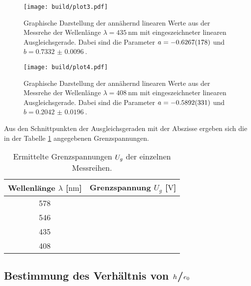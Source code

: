 \begin{figure}
    \centering
    \texttt{[image: build/plot3.pdf]}
    \caption{Graphische Darstellung der annähernd linearen Werte aus der Messrehe der Wellenlänge $\lambda = \SI{435}{\nano\meter}$ mit eingeszeichneter linearen Ausgleichsgerade. Dabei sind die Parameter $\protect a = \SI{-0.6267(178)}{}$ und $b = \SI{0.7332(96)}{}$.} 
    \label{fig:violet}
\end{figure}

\begin{figure}
    \centering
    \texttt{[image: build/plot4.pdf]}
    \caption{Graphische Darstellung der annähernd linearen Werte aus der Messrehe der Wellenlänge $\lambda = \SI{408}{\nano\meter}$ mit eingeszeichneter linearen Ausgleichsgerade. Dabei sind die Parameter $\protect a = \SI{-0.5892(331)}{}$ und $b = \SI{0.2042(196)}{}$.} 
    \label{fig:GIGAviolet}
\end{figure}

Aus den Schnittpunkten der Ausgleichsgeraden mit der Abszisse ergeben sich die in der Tabelle \ref{tab:ugrenz} angegebenen Grenzspannungen.

\begin{table}
    \caption{Ermittelte Grenzspannungen $\protect U_{g}$ der einzelnen Messreihen.}
    \centering
    \label{tab:ugrenz}
    \begin{tabular}{c c}
        \toprule
        Wellenlänge $\lambda$ [$\si{\nano\meter}$] & Grenzspannung $U_{g}$ [$\si{\volt}$] \\
        \midrule
        578 & ~\\
        546 & ~\\
        435 & ~\\
        408 & ~\\
        \bottomrule    
    \end{tabular}
\end{table}

\subsection{Bestimmung des Verhältnis von $\protect h$/$\protect e_{0}$}

